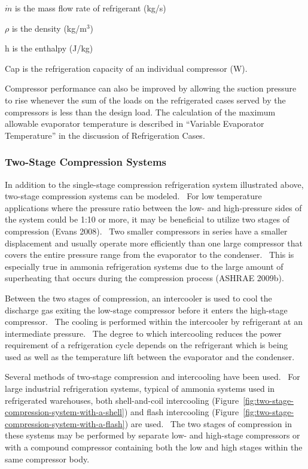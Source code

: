\(\dot m\) is the mass flow rate of refrigerant (kg/s)

\(\rho\) is the density (kg/m\(^{3}\))

h is the enthalpy (J/kg)

Cap is the refrigeration capacity of an individual compressor (W).

Compressor performance can also be improved by allowing the suction pressure to rise whenever the sum of the loads on the refrigerated cases served by the compressors is less than the design load. The calculation of the maximum allowable evaporator temperature is described in ``Variable Evaporator Temperature'' in the discussion of Refrigeration Cases.

\subsubsection{Two-Stage Compression Systems}\label{two-stage-compression-systems}

In addition to the single-stage compression refrigeration system illustrated above, two-stage compression systems can be modeled.~ For low temperature applications where the pressure ratio between the low- and high-pressure sides of the system could be 1:10 or more, it may be beneficial to utilize two stages of compression (Evans 2008).~ Two smaller compressors in series have a smaller displacement and usually operate more efficiently than one large compressor that covers the entire pressure range from the evaporator to the condenser.~ This is especially true in ammonia refrigeration systems due to the large amount of superheating that occurs during the compression process (ASHRAE 2009b).

Between the two stages of compression, an intercooler is used to cool the discharge gas exiting the low-stage compressor before it enters the high-stage compressor.~ The cooling is performed within the intercooler by refrigerant at an intermediate pressure.~ The degree to which intercooling reduces the power requirement of a refrigeration cycle depends on the refrigerant which is being used as well as the temperature lift between the evaporator and the condenser.

Several methods of two-stage compression and intercooling have been used.~ For large industrial refrigeration systems, typical of ammonia systems used in refrigerated warehouses, both shell-and-coil intercooling (Figure~\ref{fig:two-stage-compression-system-with-a-shell}) and flash intercooling (Figure~\ref{fig:two-stage-compression-system-with-a-flash}) are used.~ The two stages of compression in these systems may be performed by separate low- and high-stage compressors or with a compound compressor containing both the low and high stages within the same compressor body.

